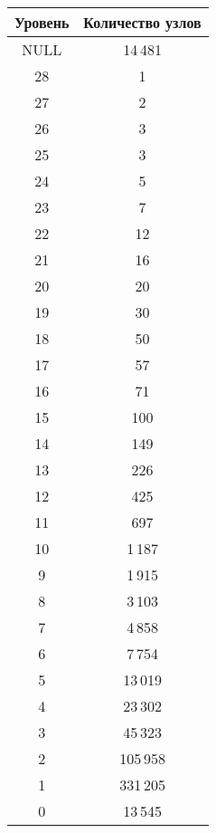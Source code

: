 \begin{multicols}{2}
\begin{center}
{\small   
\tabcolsep=3.5pt
   \begin{tabular}{|c|c|}
   \hline
   Уровень & Количество узлов\\
   \hline
   NULL & 14\,481\hphantom{99}\\
   28&\hphantom{99}1\\
   27 &\hphantom{99}2\\
   26&\hphantom{99}3\\
   25&\hphantom{99}3\\
   24&\hphantom{99}5\\
   23&\hphantom{99}7\\
   22&\hphantom{9}12\\
   21&\hphantom{9}16\\
   20&\hphantom{9}20\\
   19&\hphantom{9}30\\
   18&\hphantom{9}50\\
   17&\hphantom{9}57\\
   16&\hphantom{9}71\\
   15&100\\
   14&149\\
   13&226\\
   12&425\\
   11&697\\
   10&1\,187\hphantom{9}\\
      \hphantom{9}9&1\,915\hphantom{9}\\
      \hphantom{9}8&3\,103\hphantom{9}\\
      \hphantom{9}7&4\,858\hphantom{9}\\
      \hphantom{9}6&7\,754\hphantom{9}\\
      \hphantom{9}5&13\,019\hphantom{99}\\
      \hphantom{9}4&23\,302\hphantom{99}\\
      \hphantom{9}3&45\,323\hphantom{99}\\
      \hphantom{9}2&105\,958\hphantom{999}\\
      \hphantom{9}1& 331\,205\hphantom{999}\\
   \hphantom{9}0&13\,545\hphantom{99}\\
   \hline
   \end{tabular}
}
\end{center}


\addtocounter{table}{1}
   



\end{multicols}
